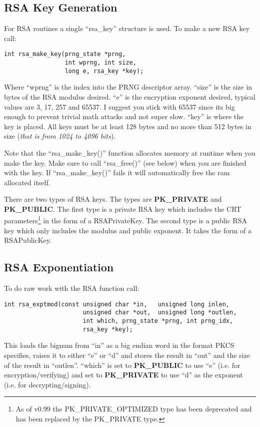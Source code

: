 \documentclass[a4paper]{book}
\begin{document}
\subsection{RSA Key Generation}

For RSA routines a single ``rsa\_key'' structure is used.  To make a new RSA key call:
\begin{verbatim}
int rsa_make_key(prng_state *prng, 
                 int wprng, int size, 
                 long e, rsa_key *key);
\end{verbatim}

Where ``wprng'' is the index into the PRNG descriptor array.  ``size'' is the size in bytes of the RSA modulus desired.
``e'' is the encryption exponent desired, typical values are 3, 17, 257 and 65537.  I suggest you stick with 65537 since its big
enough to prevent trivial math attacks and not super slow.  ``key'' is where the key is placed.  All keys must be at 
least 128 bytes and no more than 512 bytes in size (\textit{that is from 1024 to 4096 bits}).

Note that the ``rsa\_make\_key()'' function allocates memory at runtime when you make the key.  Make sure to call 
``rsa\_free()'' (see below) when you are finished with the key.  If ``rsa\_make\_key()'' fails it will automatically 
free the ram allocated itself.

 
There are two types of RSA keys.  The types are {\bf PK\_PRIVATE} and {\bf PK\_PUBLIC}.  The first type is a private 
RSA key which includes the CRT parameters\footnote{As of v0.99 the PK\_PRIVATE\_OPTIMIZED type has been deprecated
and has been replaced by the PK\_PRIVATE type.} in the form of a RSAPrivateKey.  The second type is a public RSA key
which only includes the modulus and public exponent.  It takes the form of a RSAPublicKey.

\subsection{RSA Exponentiation}

To do raw work with the RSA function call:
\begin{verbatim}
int rsa_exptmod(const unsigned char *in,   unsigned long inlen,
                      unsigned char *out,  unsigned long *outlen, 
                      int which, prng_state *prng, int prng_idx,
                      rsa_key *key);
\end{verbatim}
This loads the bignum from ``in'' as a big endian word in the format PKCS specifies, raises it to either ``e'' or ``d'' and stores the result
in ``out'' and the size of the result in ``outlen''. ``which'' is set to {\bf PK\_PUBLIC} to use ``e'' 
(i.e. for encryption/verifying) and set to {\bf PK\_PRIVATE} to use ``d'' as the exponent (i.e. for decrypting/signing).
\end{document}
